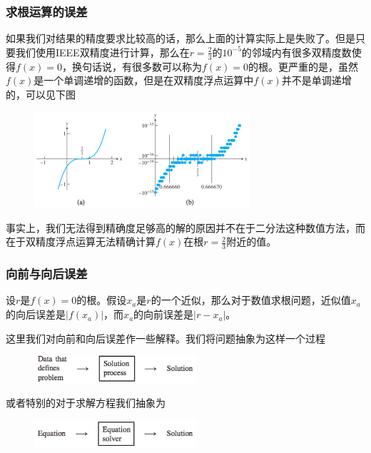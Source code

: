 \documentclass[10pt]{beamer}
\begin{document}
\begin{frame}
\frametitle{求根运算的误差}
如果我们对结果的精度要求比较高的话，那么上面的计算实际上是失败了。但是只要我们使用IEEE双精度进行计算，那么在$r = \frac{2}{3}$的$10^{-5}$的邻域内有很多双精度数使得$f(x)=0$，换句话说，有很多数可以称为$f(x)= 0$的根。更严重的是，虽然$f(x)$是一个单调递增的函数，但是在双精度浮点运算中$f(x)$并不是单调递增的，可以见下图
\begin{figure}
\includegraphics[width=8cm]{figs/1-3-1_Foward&Backward_Error-2} 
\end{figure}
事实上，我们无法得到精确度足够高的解的原因并不在于二分法这种数值方法，而在于双精度浮点运算无法精确计算$f(x)$在根$r = \frac{2}{3}$附近的值。
\end{frame}


\begin{frame}
\frametitle{向前与向后误差}
\begin{definition}[向前向后误差]
设$r$是$f(x) = 0$的根。假设$x_a$是$r$的一个近似，那么对于数值求根问题，近似值$x_a$的向后误差是$|f(x_a)|$，而$x_a$的向前误差是$|r - x_a|$。
\end{definition}

这里我们对向前和向后误差作一些解释。我们将问题抽象为这样一个过程
\begin{figure}
\includegraphics[width=6cm]{figs/1-3-1_Foward&Backward_Error-3} 
\end{figure}
或者特别的对于求解方程我们抽象为
\begin{figure}
\includegraphics[width=6cm]{figs/1-3-1_Foward&Backward_Error-4} 
\end{figure}
\end{frame}
\end{document}
